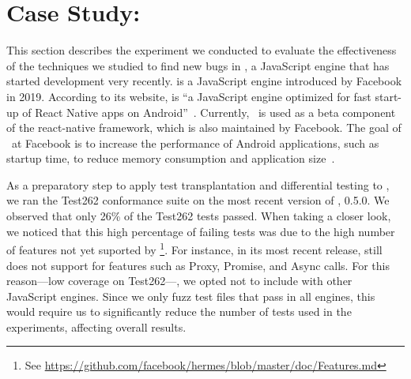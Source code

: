 \documentclass[smallextended]{svjour3}
\begin{document}
\section{Case Study: \hermes}
\label{sec:hermes}

This section describes the experiment we conducted to evaluate the
effectiveness of the techniques we studied to find new bugs in
\hermes, a JavaScript engine that has started development very
recently. \hermes is a JavaScript engine introduced by Facebook in
2019. According to its website, \hermes is ``a JavaScript engine
optimized for fast start-up of React Native apps on
Android''~\cite{hermes2020repo}. Currently, \hermes\ is used as a beta
component of the react-native framework, which is also maintained by
Facebook. The goal of \hermes\ at Facebook is to increase the
performance of Android applications, such as startup time, to reduce
memory consumption and application size~\cite{reactnative2020hermes}.


As a preparatory step to apply test transplantation and differential
testing to \hermes, we ran the Test262 conformance suite on the most
recent version of \hermes, 0.5.0. We observed that only 26\% of the
Test262 tests passed. When taking a closer look, we noticed that this
high percentage of failing tests was due to the high number of
features not yet suported by \hermes\footnote{See
  \url{https://github.com/facebook/hermes/blob/master/doc/Features.md}}. For
instance, in its most recent release, \hermes still does not support
for features such as Proxy, Promise, and Async calls. For this
reason---low coverage on Test262---, we opted not to include \hermes
with other JavaScript engines. Since we only fuzz test files that pass
in all engines, this would require us to significantly reduce the
number of tests used in the experiments, affecting overall results.
\end{document}
